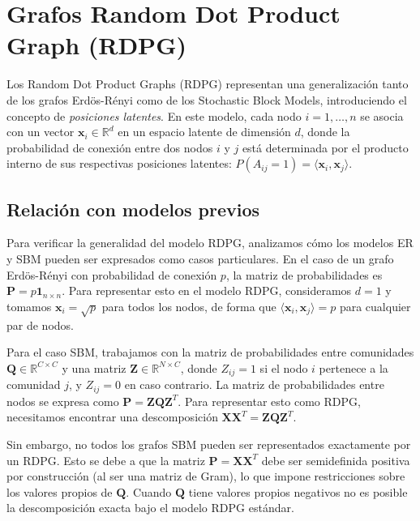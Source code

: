 \documentclass{article}
\begin{document}
\section{Grafos Random Dot Product Graph (RDPG)}

Los Random Dot Product Graphs (RDPG) representan una generalización tanto de los grafos Erdös-Rényi como de los Stochastic Block Models, introduciendo el concepto de \emph{posiciones latentes}. En este modelo, cada nodo $i = 1, \ldots, n$ se asocia con un vector $\mathbf{x}_i \in \mathbb{R}^d$ en un espacio latente de dimensión $d$, donde la probabilidad de conexión entre dos nodos $i$ y $j$ está determinada por el producto interno de sus respectivas posiciones latentes: $P(A_{ij} = 1) = \langle \mathbf{x}_i, \mathbf{x}_j \rangle$.

\subsection{Relación con modelos previos}

Para verificar la generalidad del modelo RDPG, analizamos cómo los modelos ER y SBM pueden ser expresados como casos particulares. En el caso de un grafo Erdös-Rényi con probabilidad de conexión $p$, la matriz de probabilidades es $\mathbf{P} = p \mathbf{1}_{n \times n}$. Para representar esto en el modelo RDPG, consideramos $d=1$ y tomamos $\mathbf{x}_i = \sqrt{p}$ para todos los nodos, de forma que $\langle \mathbf{x}_i, \mathbf{x}_j \rangle = p$ para cualquier par de nodos.

Para el caso SBM, trabajamos con la matriz de probabilidades entre comunidades $\mathbf{Q} \in \mathbb{R}^{C \times C}$ y una matriz $\mathbf{Z} \in \mathbb{R}^{N \times C}$, donde $Z_{ij} = 1$ si el nodo $i$ pertenece a la comunidad $j$, y $Z_{ij} = 0$ en caso contrario. La matriz de probabilidades entre nodos se expresa como $\mathbf{P} = \mathbf{Z}\mathbf{Q}\mathbf{Z}^T$. Para representar esto como RDPG, necesitamos encontrar una descomposición $\mathbf{X}\mathbf{X}^T = \mathbf{Z}\mathbf{Q}\mathbf{Z}^T$.

Sin embargo, no todos los grafos SBM pueden ser representados exactamente por un RDPG. Esto se debe a que la matriz $\mathbf{P} = \mathbf{X}\mathbf{X}^T$ debe ser semidefinida positiva por construcción (al ser una matriz de Gram), lo que impone restricciones sobre los valores propios de $\mathbf{Q}$. Cuando $\mathbf{Q}$ tiene valores propios negativos no es posible la descomposición exacta bajo el modelo RDPG estándar.
\end{document}
